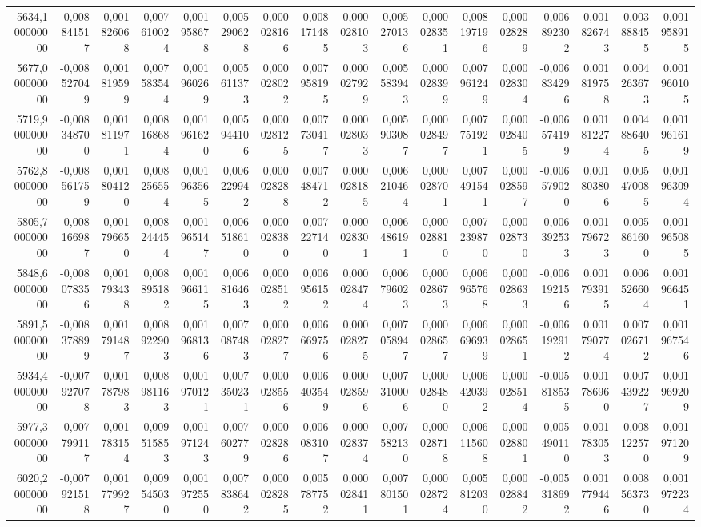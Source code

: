 \begin{longtable}{rrrrrrrrrrrrrrrrr}
5634,100000000 & -0,008841517 & 0,001826068 & 0,007610024 & 0,001958678 & 0,005290628 & 0,000028166 & 0,008171485 & 0,000028103 & 0,005270136 & 0,000028351 & 0,008197196 & 0,000028289 & -0,006892302 & 0,001826743 & 0,003888455 & 0,001958915\\
5677,000000000 & -0,008527049 & 0,001819599 & 0,007583544 & 0,001960269 & 0,005611373 & 0,000028022 & 0,007958195 & 0,000027929 & 0,005583943 & 0,000028399 & 0,007961249 & 0,000028304 & -0,006834296 & 0,001819758 & 0,004263673 & 0,001960105\\
5719,900000000 & -0,008348700 & 0,001811971 & 0,008168684 & 0,001961620 & 0,005944106 & 0,000028125 & 0,007730417 & 0,000028033 & 0,005903087 & 0,000028497 & 0,007751921 & 0,000028405 & -0,006574199 & 0,001812274 & 0,004886405 & 0,001961619\\
5762,800000000 & -0,008561759 & 0,001804120 & 0,008256554 & 0,001963565 & 0,006229942 & 0,000028288 & 0,007484712 & 0,000028185 & 0,006210464 & 0,000028701 & 0,007491541 & 0,000028597 & -0,006579020 & 0,001803806 & 0,005470085 & 0,001963094\\
5805,700000000 & -0,008166987 & 0,001796650 & 0,008244454 & 0,001965147 & 0,006518610 & 0,000028380 & 0,007227140 & 0,000028301 & 0,006486191 & 0,000028810 & 0,007239870 & 0,000028730 & -0,006392533 & 0,001796723 & 0,005861600 & 0,001965085\\
5848,600000000 & -0,008078356 & 0,001793438 & 0,008895182 & 0,001966115 & 0,006816463 & 0,000028512 & 0,006956152 & 0,000028474 & 0,006796023 & 0,000028673 & 0,006965768 & 0,000028633 & -0,006192156 & 0,001793915 & 0,006526604 & 0,001966451\\
5891,500000000 & -0,008378899 & 0,001791487 & 0,008922903 & 0,001968136 & 0,007087483 & 0,000028277 & 0,006669756 & 0,000028275 & 0,007058947 & 0,000028657 & 0,006696939 & 0,000028651 & -0,006192912 & 0,001790774 & 0,007026712 & 0,001967546\\
5934,400000000 & -0,007927078 & 0,001787983 & 0,008981163 & 0,001970121 & 0,007350231 & 0,000028556 & 0,006403549 & 0,000028596 & 0,007310006 & 0,000028480 & 0,006420392 & 0,000028514 & -0,005818535 & 0,001786960 & 0,007439227 & 0,001969209\\
5977,300000000 & -0,007799117 & 0,001783154 & 0,009515853 & 0,001971243 & 0,007602779 & 0,000028286 & 0,006083107 & 0,000028374 & 0,007582130 & 0,000028718 & 0,006115608 & 0,000028801 & -0,005490110 & 0,001783053 & 0,008122570 & 0,001971209\\
6020,200000000 & -0,007921518 & 0,001779927 & 0,009545030 & 0,001972550 & 0,007838642 & 0,000028285 & 0,005787752 & 0,000028411 & 0,007801501 & 0,000028724 & 0,005812030 & 0,000028842 & -0,005318692 & 0,001779446 & 0,008563730 & 0,001972234\\

\end{longtable}
